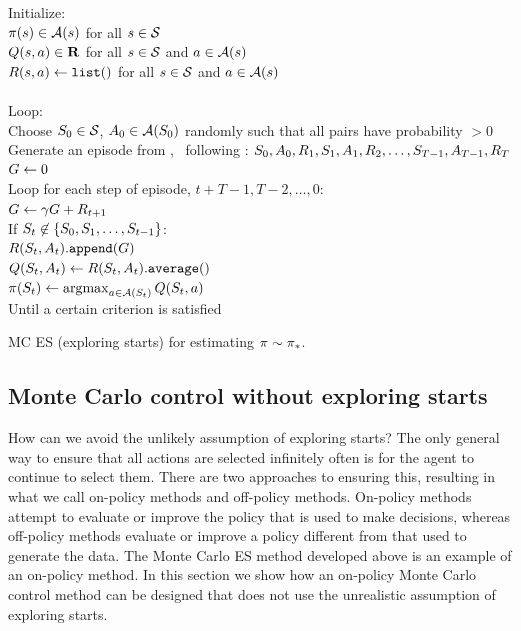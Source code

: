 \begin{table}
\beginalg
Initialize:\\
\> $\pi(s) \in \mathcal{A}(s)$ for all $s\in\mathcal{S}$\\
\> $Q(s,a) \in \mathbf{R}$ for all $s\in\mathcal{S}$ and $a\in\mathcal{A}(s)$\\
\> $R(s, a) \leftarrow {\tt list()}$ for all $s\in\mathcal{S}$ and $a\in\mathcal{A}(s)$\\
\\
Loop: \\
\> Choose $S_{0} \in \mathcal{S}$, $A_{0} \in \mathcal{A}(S_{0})$ randomly such that all pairs have probability $> 0$\\
\> Generate an episode from , \ following \pol: $S_{0}, A_{0}, R_{1}, S_{1}, A_{1}, R_{2}, \ldots, S_{T-1}, A_{T-1}, R_{T}$\\
\> $G \leftarrow 0$\\
\> Loop for each step of episode, $t+T-1, T-2, \ldots, 0$:\\
\> \> $G \leftarrow \gamma G + R_{t+1}$\\
\> \> If $S_{t} \not\in \{S_{0}, S_{1}, \ldots, S_{t-1}\}$:\\
\> \> \> $R(S_{t}, A_t){\tt.append}(G)$\\
\> \> \> $Q(S_{t}, A_t) \leftarrow R(S_{t}, A_t){\tt .average()}$\\
\> \> \> $\pi(S_{t}) \leftarrow \mathop{\mathrm {argmax}}_{a\in\mathcal{A}(S_{t})} Q(S_{t}, a)$\\
Until a certain criterion is satisfied
\endalg
\caption{MC ES (exploring starts) for estimating $\pi \sim {\ensuremath{\pi}}_\ast$.}
\label{tab:alg:mc-es-control}
\end{table}



\subsection{Monte Carlo control without exploring starts}


How can we avoid the unlikely assumption of exploring starts?
The only general way to ensure that all actions are selected infinitely often
is for the agent to continue to select them.
There are two approaches to ensuring this,
resulting in what we call on-policy methods and off-policy methods.
On-policy methods attempt to evaluate or improve the policy
that is used to make decisions,
whereas off-policy methods evaluate or improve a policy different from
that used to generate the data.
The Monte Carlo ES method developed above is
an example of an on-policy method.
In this section we show how an on-policy Monte Carlo control method
can be designed that does not use the unrealistic assumption of exploring starts.

